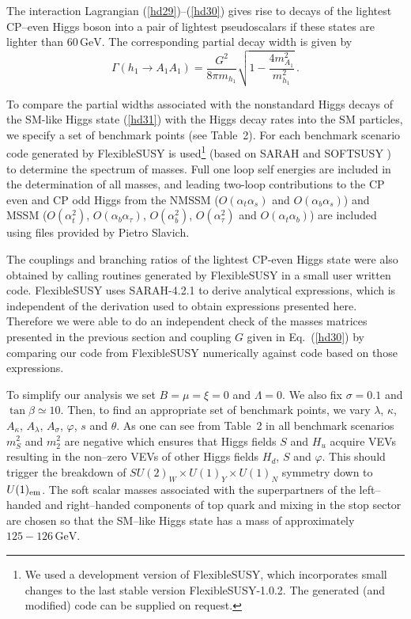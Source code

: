 \documentclass[12pt,a4paper]{article}
\def\at{\alpha_t}
\def\ab{\alpha_b}
\def\as{\alpha_s}
\def\atau{\alpha_{\tau}}
\def\oatab{O(\at\ab)}
\def\oatas{O(\at\as)}
\def\oabas{O(\ab\as)}
\def\oatq{O(\at^2)}
\def\oabq{O(\ab^2)}
\def\oatauq{O(\atau^2)}
\def\oabatau{O(\ab \atau)}
\begin{document}
The interaction Lagrangian (\ref{hd29})--(\ref{hd30}) gives rise to decays of the lightest CP--even Higgs boson into
a pair of lightest pseudoscalars if these states are lighter than $60\,\mbox{GeV}$. The corresponding partial decay width is given by
\begin{equation}
\Gamma(h_1\to A_1 A_1)=\dfrac{G^2}{8\pi m_{h_1}}\sqrt{1-\dfrac{4 m_{A_1}^2}{m_{h_1}^2}}\,.
\label{hd31}
\end{equation}

To compare the partial widths associated with the nonstandard Higgs decays of the 
SM-like Higgs state (\ref{hd31})
with the Higgs decay rates into the SM particles, we specify a set of benchmark points (see Table~2).  For each benchmark scenario code generated by FlexibleSUSY
\cite{Athron:2014yba} is used\footnote{We used a development version of FlexibleSUSY, which incorporates small changes to the last stable version FlexibleSUSY-1.0.2.  The generated (and modified) code can be supplied on request.} (based on SARAH \cite{Staub:2010ty,Staub:2009bi,Staub:2010jh,Staub:2012pb,Staub:2013tta} and SOFTSUSY \cite{Allanach:2001kg,Allanach:2013kza}) to determine the spectrum of masses.    Full one loop self energies are included in the determination of all masses, and leading two-loop contributions to the CP even and CP odd Higgs from the NMSSM ($\oatas$ and $\oabas$) \cite{Degrassi:2009yq} and MSSM ($\oatq$, $\oabatau$, $\oabq$, $\oatauq$ and $\oatab$) \cite{Degrassi:2001yf,Brignole:2001jy,Dedes:2002dy,Brignole:2002bz,Dedes:2003km} are included using files provided by Pietro Slavich. 

The couplings and branching ratios of the lightest CP-even Higgs state were also obtained by calling routines generated by FlexibleSUSY in a small user written code.  FlexibleSUSY uses SARAH-4.2.1 \cite{Staub:2010ty,Staub:2009bi,Staub:2010jh,Staub:2012pb,Staub:2013tta} to derive analytical expressions, which is independent of the derivation used to obtain expressions presented here. Therefore we were able to do an independent check of the masses matrices presented in the previous section and coupling $G$ given in 
Eq.~(\ref{hd30}) by comparing our code from FlexibleSUSY numerically against code 
based on those expressions.  

To simplify our analysis we set $B=\mu=\xi=0$ and $\Lambda=0$. We also fix $\sigma=0.1$ and $\tan\beta\simeq 10$.
Then, to find an appropriate set of benchmark points, we vary $\lambda$, $\kappa$, $A_{\kappa}$,
$A_{\lambda}$, $A_{\sigma}$, $\varphi$, $s$ and $\theta$. As one can see from Table~2 in all benchmark scenarios
$m_{S}^2$ and  $m_2^2$ are negative which ensures that Higgs fields $S$ and $H_u$ acquire VEVs
resulting in the non--zero VEVs of other Higgs fields $H_d$, $S$ and $\varphi$. This should trigger the breakdown
of $SU(2)_W\times U(1)_Y\times U(1)_{N}$ symmetry down to $U(1)_{\rm em}$. The soft scalar masses associated with
the superpartners of the left--handed and right--handed components of top quark and mixing in the stop sector are chosen
so that the SM--like Higgs state has a mass of approximately $125-126\,\mbox{GeV}$.
\end{document}
